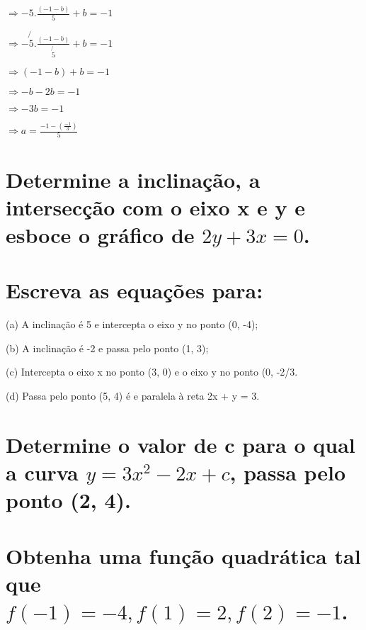 \documentclass{article}
\begin{document}
		$\Rightarrow -5.\frac{(-1 - b)}{5} + b= -1$

		$\Rightarrow -\not{5}.\frac{(-1 - b)}{\not{5}} + b= -1$

		$\Rightarrow (-1 - b) + b = -1$

		$\Rightarrow -b - 2b = -1$

		$\Rightarrow  -3b = -1$


		$\Rightarrow a = \frac{-1 - (\frac{-1}{3})}{5}$

	\section{Determine a inclinação, a intersecção com o eixo x e y e esboce o gráfico de $2y + 3x = 0$.}

	\section{Escreva as equações para:}

		\hspace{4mm} (a) A inclinação é 5 e intercepta o eixo y no ponto (0, -4);

		(b) A inclinação é -2 e passa pelo ponto (1, 3);

		(c) Intercepta o eixo x no ponto (3, 0) e o eixo y no ponto (0, -2/3.

		(d) Passa pelo ponto (5, 4) é e paralela à reta 2x + y = 3.


	\section{Determine o valor de c para o qual a curva $y = 3x^2 - 2x + c$, passa pelo ponto (2, 4).}


	\section{ Obtenha uma função quadrática tal que $f(-1) = -4, f(1) = 2, f(2)= -1$.}
\end{document}
